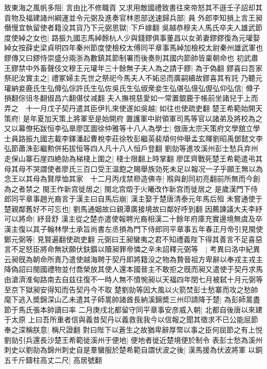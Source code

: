 致東海之風帆多阻|{
	言由比不修職貢}
又求用敵國禮致書往來帝怒其不遜壬子詔却其貢物及福建諸州綱運並令元弼及進奏官林恩部送速歸兵部|{
	員}
外郎李知損上言王昶僭慢宜執留使者籍没其貨乃下元弼恩獄|{
	下戶嫁翻}
吳越恭穆夫人馬氏卒夫人雄武節度使綽之女也|{
	路振九國志馬綽餘杭人少與錢鏐俱事董昌以女弟妻鏐鏐復為元瓘娶綽女按薛史梁貞明四年秦州節度使檢校太傅同平章事馬綽加檢校太尉秦州雄武軍也鏐傳又曰鏐恃崇盛分兩浙為數鎮其節制署而後奏則其國内節帥皆稟朝命也}
初武肅王鏐禁中外畜聲伎文穆王元瓘年三十餘無子夫人為之請于鏐|{
	為于偽翻}
鏐喜曰吾家祭祀汝實主之|{
	禮冢婦主先世之祭祀今馬夫人不妬忌而廣嗣續故鏐喜其有託}
乃聽元瓘納妾鹿氏生弘僔弘倧許氏生弘佐吳氏生弘俶衆妾生弘偡弘億弘偓弘仰弘信|{
	僔子損翻倧徂冬翻俶昌六翻偡仗减翻}
夫人撫視慈愛如一常置銀鹿于帳前坐諸兒于上而弄之　十一月戊子契丹遣其臣伊扎來使遂如吳越|{
	如往也使疏吏翻}
楚王希範始開天策府|{
	是年夏加天策上將軍至是始開府}
置護軍中尉領軍司馬等官以諸弟及將校為之又以幕僚拓跋恒李弘臯廖匡圖徐仲雅等十八人為學士|{
	倣唐太宗天策府文學舘立學士員路振九國志載李鐸潘起曹梲李莊徐牧彭繼英裴頏何仲舉孟玄暉劉昭禹鄧懿文李弘節蕭洙彭繼勲併拓拔恒等四人凡十八人恒戶登翻}
劉勍等進攻溪州彭士愁兵弃州走保山寨石崖四絶勍為梯棧上圍之|{
	棧士限翻上時掌翻}
廖匡齊戰死楚王希範遣弔其母其母不哭謂使者廖氏三百口受王温飽之賜舉族効死未足以報况一子乎願王無以為念王以其母為賢厚恤其家　十二月丙戌禁剙造佛寺|{
	剏與創同初亮翻前所無而今創為之者禁之}
閩王作新宫徙居之|{
	閩北宫燬于火曦改作新宫而徙居之}
是歲漢門下侍郎同平章事趙光裔言于漢主曰自馬后崩|{
	漢主娶于楚唐清泰元年馬后殂}
未嘗通使于楚親鄰舊好不可忘也|{
	劉馬通姻故曰親潭廣接境故曰鄰好呼到翻}
因薦諫議大夫李紓可以將命|{
	紓音舒}
漢主從之楚亦遣使報聘光裔相漢二十餘年府庫充實邊境無虞及卒漢主復以其子翰林學士承旨尚書左丞損為門下侍郎同平章事五年春正月帝引見閩使鄭元弼等|{
	見賢遍翻使疏吏翻}
元弼曰王昶蠻夷之君不知禮義陛下得其善言不足喜惡言不足怒臣將命無狀願伏鈇鑕以贖昶罪帝憐之辛未詔釋元弼等　|{
	考異曰洛中紀異云昶旣為朝命所責乃遣使越海聘于契丹即將籍没之物為贄晉祖方卑辭以奉戎主戎主降偽詔曰閩國禮物並付喬榮放其使人還本國晉主不敢拒之旣而昶又遣使于契丹求馬由滄濟淮甸路南去自兹往復不一時人無不憤惋昶以天福四年閏七月被弑十月元弼等至京下獄昶安得知而告契丹今不取}
楚劉勍等因大風以火箭焚彭士愁寨而攻之愁帥麾下逃入奬錦深山乙未遣其子師暠帥諸酋長納溪錦奬三州印請降于楚|{
	為彭師暠盡節于馬氏張本帥讀曰率}
二月庚戌北都留守同平章事安彦威入朝|{
	北都自後唐以來建于太原}
上曰吾所重者信與義昔契丹以義救我我今以信報之聞其徵求不已公能屈節奉之深稱朕意|{
	稱尺證翻}
對曰陛下以蒼生之故猶卑辭厚幣以事之臣何屈節之有上悦　劉勍引兵還長沙楚王希範徙溪州于便地|{
	便地者徙近楚境便於制令}
表彭士愁為溪州刺史以劉勍為錦州刺史自是羣蠻服於楚希範自謂伏波之後|{
	漢馬援為伏波將軍}
以銅五千斤鑄柱高丈二尺|{
	高居號翻}
